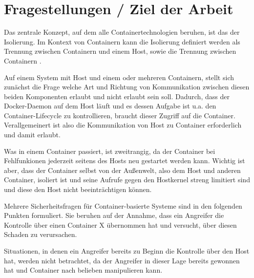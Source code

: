 \documentclass[../main.tex]{subfiles}
\begin{document}
\chapter{Fragestellungen / Ziel der Arbeit}
\label{question}



  Das zentrale Konzept, auf dem alle Containertechnologien beruhen, ist das der Isolierung. Im Kontext von Containern kann die Isolierung definiert werden als Trennung zwischen Containern und einem Host, sowie die Trennung zwischen Containern \cite[S.1]{dockerSec2}.

  Auf einem System mit Host und einem oder mehreren Containern, stellt sich zunächst die Frage welche Art und Richtung von Kommunikation zwischen diesen beiden Komponenten erlaubt und nicht erlaubt sein soll. Dadurch, dass der Docker-Daemon auf dem Host läuft und es dessen Aufgabe ist u.a. den Container-Lifecycle zu kontrollieren, braucht dieser Zugriff auf die Container. Verallgemeinert ist also die Kommunikation von Host zu Container erforderlich und damit erlaubt.

  Was in einem Container passiert, ist zweitrangig, da der Container bei Fehlfunkionen jederzeit seitens des Hosts neu gestartet werden kann. Wichtig ist aber, dass der Container selbst von der Außenwelt, also dem Host und anderen Container, isoliert ist und seine Aufrufe gegen den Hostkernel streng limitiert sind und diese den Host nicht beeinträchtigen können.

  Mehrere Sicherheitsfragen für Container-basierte Systeme sind in den folgenden Punkten formuliert. Sie beruhen auf der Annahme, dass ein Angreifer die Kontrolle über einen Container X übernommen hat und versucht, über diesen Schaden zu verursachen.

  Situationen, in denen ein Angreifer bereits zu Beginn die Kontrolle über den Host hat, werden nicht betrachtet, da der Angreifer in dieser Lage bereits gewonnen hat und Container nach belieben manipulieren kann.
\end{document}
